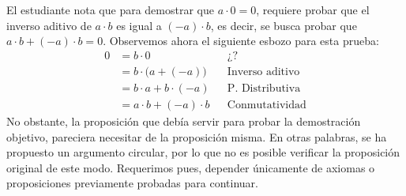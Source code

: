 \documentclass[11pt]{article}
\begin{document}
El estudiante nota que para demostrar que $a\cdot 0 = 0$, requiere probar que el inverso aditivo de $a\cdot b$ es igual a $(-a)\cdot b$, es decir, se busca probar que $a\cdot b+(-a)\cdot b=0$. Observemos ahora el siguiente esbozo para esta prueba:
\begin{align*}
    0 &= b\cdot 0 && \text{¿?}\\
    &= b\cdot \bigl(a+(-a)\bigr) && \text{Inverso aditivo}\\
    &= b\cdot a + b\cdot (-a) && \text{P. Distributiva}\\
    &= a\cdot b + (-a) \cdot b && \text{Conmutatividad}
\end{align*}
No obstante, la proposición que debía servir para probar la demostración objetivo, pareciera necesitar de la proposición misma. En otras palabras, se ha propuesto un argumento circular, por lo que no es posible verificar la proposición original de este modo. Requerimos pues, depender únicamente de axiomas o proposiciones previamente probadas para continuar.

\pagebreak
\end{document}
